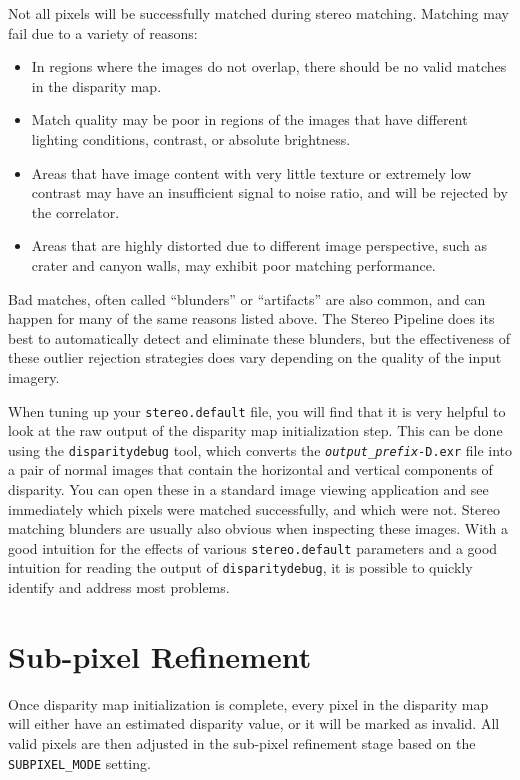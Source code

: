 Not all pixels will be successfully matched during stereo matching.
Matching may fail due to a variety of reasons:

\begin{itemize}
\item In regions where the images do not overlap, there should be no
  valid matches in the disparity map.
\item Match quality may be poor in regions of the images that have
  different lighting conditions, contrast, or absolute brightness.  
\item Areas that have image content with very little texture or
  extremely low contrast may have an insufficient signal to noise
  ratio, and will be rejected by the correlator.
\item Areas that are highly distorted due to different image
  perspective, such as crater and canyon walls, may exhibit poor
  matching performance.
\end{itemize}

Bad matches, often called ``blunders'' or ``artifacts'' are also
common, and can happen for many of the same reasons listed above.  The
Stereo Pipeline does its best to automatically detect and eliminate
these blunders, but the effectiveness of these outlier rejection
strategies does vary depending on the quality of the input imagery.

When tuning up your {\tt stereo.default} file, you will find that
it is very helpful to look at the raw output of the disparity map
initialization step.  This can be done using the {\tt disparitydebug}
tool, which converts the \texttt{\textit{output\_prefix}-D.exr}
file into a pair of normal images that contain the horizontal and
vertical components of disparity.  You can open these in a standard
image viewing application and see immediately which pixels were
matched successfully, and which were not.  Stereo matching blunders
are usually also obvious when inspecting these images.  With a good
intuition for the effects of various {\tt stereo.default} parameters
and a good intuition for reading the output of {\tt disparitydebug},
it is possible to quickly identify and address most problems.

\section{Sub-pixel Refinement}
\label{sec:subpixel}

Once disparity map initialization is complete, every pixel in the
disparity map will either have an estimated disparity value, or it
will be marked as invalid.  All valid pixels are then adjusted in the
sub-pixel refinement stage based on the \texttt{SUBPIXEL\_MODE} setting.

